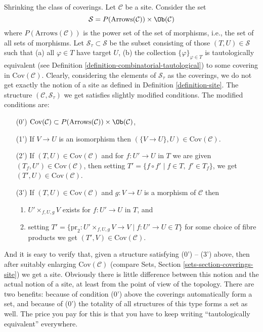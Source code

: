 \begin{remark}
\label{remark-shrink-coverings}
Shrinking the class of coverings. Let $\mathcal{C}$ be a site.
Consider the set
$$
\mathcal{S} = P(\text{Arrows}(\mathcal{C})) \times \Ob(\mathcal{C})
$$
where $P(\text{Arrows}(\mathcal{C}))$ is the power set of the set of morphisms,
i.e., the set of all sets of morphisms.
Let $\mathcal{S}_\tau \subset \mathcal{S}$
be the subset consisting of those $(T, U) \in \mathcal{S}$ such that
(a) all $\varphi \in T$ have target $U$,
(b) the collection $\{\varphi\}_{\varphi \in T}$ is tautologically
equivalent (see Definition \ref{definition-combinatorial-tautological})
to some covering in $\text{Cov}(\mathcal{C})$.
Clearly, considering the elements of $\mathcal{S}_\tau$ as
the coverings, we do not get exactly the notion of a site
as defined in Definition \ref{definition-site}.
The structure $(\mathcal{C}, \mathcal{S}_\tau)$
we get satisfies slightly modified conditions. The modified
conditions are:
\begin{enumerate}
\item[(0')] $\text{Cov}(\mathcal{C}) \subset
P(\text{Arrows}(\mathcal{C})) \times \Ob(\mathcal{C})$,
\item[(1')] If $V \to U$ is an isomorphism then
$(\{V \to U\}, U) \in \text{Cov}(\mathcal{C})$.
\item[(2')] If $(T, U) \in \text{Cov}(\mathcal{C})$
and for $f : U' \to U$ in $T$ we are given
$(T_f, U') \in \text{Cov}(\mathcal{C})$,
then setting $T' = \{f \circ f' \mid f \in T,\ f' \in T_f\}$,
we get $(T', U) \in \text{Cov}(\mathcal{C})$.
\item[(3')] If $(T, U) \in \text{Cov}(\mathcal{C})$ and $g : V \to U$
is a morphism of $\mathcal{C}$ then
\begin{enumerate}
\item $U' \times_{f, U, g} V$ exists for $f : U' \to U$ in $T$, and
\item setting
$T' = \{\text{pr}_2 : U' \times_{f, U, g} V \to V \mid f : U' \to U \in T\}$
for some choice of fibre products we get $(T', V) \in \text{Cov}(\mathcal{C})$.
\end{enumerate}
\end{enumerate}
And it is easy to verify that, given a structure satisfying
(0') -- (3') above, then after suitably enlarging
$\text{Cov}(\mathcal{C})$ (compare Sets,
Section \ref{sets-section-coverings-site}) we get a site.
Obviously there is little difference between this notion and the
actual notion of a site, at least from the point of view of the
topology. There are two benefits:
because of condition (0') above the coverings automatically
form a set, and because of (0') the totality of all structures
of this type forms a set as well.
The price you pay for this is that you have to keep writing
``tautologically equivalent'' everywhere.
\end{remark}

















